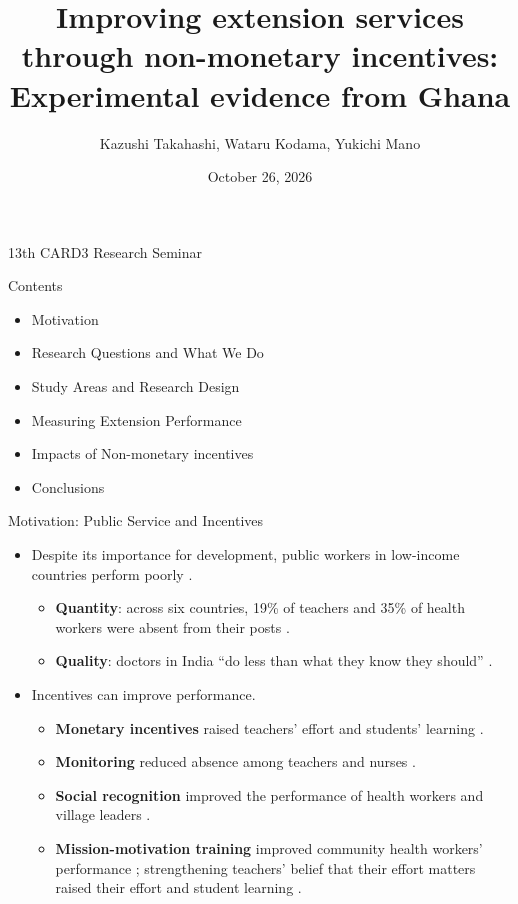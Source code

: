 \documentclass[aspectratio=169]{beamer}
\title[Improving extension services]{Improving extension services through non-monetary incentives: Experimental evidence from Ghana}
\author[Takahashi et al.]{Kazushi Takahashi, Wataru Kodama, Yukichi Mano}
\date{October 26, 2026}
\begin{document}
\begin{frame}{}
		\titlepage
        \centering
        13th CARD3 Research Seminar
	\end{frame}

\begin{frame}{Contents} %
		\begin{itemize}
			\item Motivation %
			\item Research Questions and What We Do
			\item Study Areas and Research Design
			\item Measuring Extension Performance
			\item Impacts of Non-monetary incentives
            \item Conclusions
		\end{itemize}
	\end{frame}

\begin{frame}{Motivation: Public Service and Incentives}
	\begin{itemize}
		\item Despite its importance for development, public workers in low-income
		countries perform poorly \citep{duflo_incentives_2012, finan_chapter_2017}.
		\begin{itemize}
			\item \textbf{Quantity}: across six countries, 19\% of teachers and 35\% of health
			workers were absent from their posts \citep{chaudhury_missing_2006}.
			\item \textbf{Quality}: doctors in India ``do less than what they know they should''
			\citep{das_money_2007}.
		\end{itemize}
		\item Incentives can improve performance.
		\begin{itemize}
			\item \textbf{Monetary incentives} raised teachers' effort and students' learning
			\citep{leaver_recruitment_2021, muralidharan_teacher_2011}.
			\item \textbf{Monitoring} reduced absence among teachers \citep{duflo_incentives_2012}
			and nurses \citep{banerjee_putting_2008}.
			\item \textbf{Social recognition} improved the performance of health workers
			\citep{ashraf_awards_2014} and village leaders \citep{mansuri_money_2023}.
			\item \textbf{Mission-motivation training} improved community health workers'
			performance \citep{khan_mission_2025}; strengthening teachers' belief that their
			effort matters raised their effort and student learning \citep{Kaur2023}.
		\end{itemize}
	\end{itemize}
\end{frame}
\end{document}
